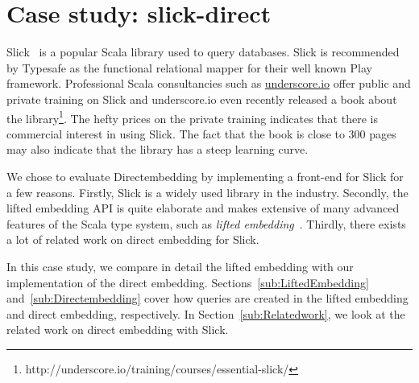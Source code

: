 \section{Case study: slick-direct} %
\label{sec:CaseStudy}
Slick~\autocite{typesafe_slick_2015} is a popular Scala library used to query databases.
Slick is recommended by Typesafe as the functional relational mapper for their well known Play framework.
Professional Scala consultancies such as \href{http://underscore.io}{underscore.io} offer public and private training on Slick and underscore.io even recently released a book about the library\footnote{http://underscore.io/training/courses/essential-slick/}.
The hefty prices on the private training indicates that there is commercial interest in using Slick.
The fact that the book is close to 300 pages may also indicate that the library has a steep learning curve.

We chose to evaluate Directembedding by implementing a front-end for Slick for a few reasons.
Firstly, Slick is a widely used library in the industry.
Secondly, the lifted embedding API is quite elaborate and makes extensive of many advanced features of the Scala type system, such as \emph{lifted embedding}~\autocite{oliveira_type_2010}.
Thirdly, there exists a lot of related work on direct embedding for Slick.

In this case study, we compare in detail the lifted embedding with our implementation of the direct embedding.
Sections~\ref{sub:LiftedEmbedding} and~\ref{sub:Directembedding} cover how queries are created in the lifted embedding and direct embedding, respectively.
In Section~\ref{sub:Relatedwork}, we look at the related work on direct embedding with Slick.

